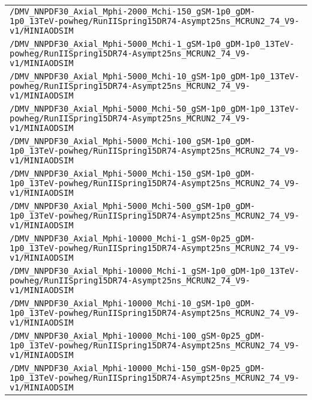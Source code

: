\begin{center}
\begin{tabular}{l}
\verb!/DMV_NNPDF30_Axial_Mphi-2000_Mchi-150_gSM-1p0_gDM-1p0_13TeV-powheg/RunIISpring15DR74-Asympt25ns_MCRUN2_74_V9-v1/MINIAODSIM! \tabularnewline
\verb!/DMV_NNPDF30_Axial_Mphi-5000_Mchi-1_gSM-1p0_gDM-1p0_13TeV-powheg/RunIISpring15DR74-Asympt25ns_MCRUN2_74_V9-v1/MINIAODSIM! \tabularnewline
\verb!/DMV_NNPDF30_Axial_Mphi-5000_Mchi-10_gSM-1p0_gDM-1p0_13TeV-powheg/RunIISpring15DR74-Asympt25ns_MCRUN2_74_V9-v1/MINIAODSIM! \tabularnewline
\verb!/DMV_NNPDF30_Axial_Mphi-5000_Mchi-50_gSM-1p0_gDM-1p0_13TeV-powheg/RunIISpring15DR74-Asympt25ns_MCRUN2_74_V9-v1/MINIAODSIM! \tabularnewline
\verb!/DMV_NNPDF30_Axial_Mphi-5000_Mchi-100_gSM-1p0_gDM-1p0_13TeV-powheg/RunIISpring15DR74-Asympt25ns_MCRUN2_74_V9-v1/MINIAODSIM! \tabularnewline
\verb!/DMV_NNPDF30_Axial_Mphi-5000_Mchi-150_gSM-1p0_gDM-1p0_13TeV-powheg/RunIISpring15DR74-Asympt25ns_MCRUN2_74_V9-v1/MINIAODSIM! \tabularnewline
\verb!/DMV_NNPDF30_Axial_Mphi-5000_Mchi-500_gSM-1p0_gDM-1p0_13TeV-powheg/RunIISpring15DR74-Asympt25ns_MCRUN2_74_V9-v1/MINIAODSIM! \tabularnewline
\verb!/DMV_NNPDF30_Axial_Mphi-10000_Mchi-1_gSM-0p25_gDM-1p0_13TeV-powheg/RunIISpring15DR74-Asympt25ns_MCRUN2_74_V9-v1/MINIAODSIM! \tabularnewline
\verb!/DMV_NNPDF30_Axial_Mphi-10000_Mchi-1_gSM-1p0_gDM-1p0_13TeV-powheg/RunIISpring15DR74-Asympt25ns_MCRUN2_74_V9-v1/MINIAODSIM! \tabularnewline
\verb!/DMV_NNPDF30_Axial_Mphi-10000_Mchi-10_gSM-1p0_gDM-1p0_13TeV-powheg/RunIISpring15DR74-Asympt25ns_MCRUN2_74_V9-v1/MINIAODSIM! \tabularnewline
\verb!/DMV_NNPDF30_Axial_Mphi-10000_Mchi-100_gSM-0p25_gDM-1p0_13TeV-powheg/RunIISpring15DR74-Asympt25ns_MCRUN2_74_V9-v1/MINIAODSIM! \tabularnewline
\verb!/DMV_NNPDF30_Axial_Mphi-10000_Mchi-150_gSM-0p25_gDM-1p0_13TeV-powheg/RunIISpring15DR74-Asympt25ns_MCRUN2_74_V9-v1/MINIAODSIM! \tabularnewline
\hline
\end{tabular}\end{center}
